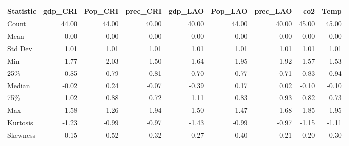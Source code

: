 \begin{table}[htbp]
\centering
{}
\label{tab:time_series_sum}
\footnotesize
\setlength{\tabcolsep}{4pt}
\renewcommand{\arraystretch}{0.9}
\begin{tabular}{lrrrrrrrr}
\toprule
\textbf{Statistic} & \textbf{gdp\_CRI} & \textbf{Pop\_CRI} & \textbf{prec\_CRI} & \textbf{gdp\_LAO} & \textbf{Pop\_LAO} & \textbf{prec\_LAO} & \textbf{co2} & \textbf{Temp} \\
\midrule
Count & 44.00 & 44.00 & 40.00 & 40.00 & 44.00 & 40.00 & 45.00 & 45.00 \\
Mean & -0.00 & -0.00 & 0.00 & -0.00 & 0.00 & 0.00 & -0.00 & 0.00 \\
Std Dev & 1.01 & 1.01 & 1.01 & 1.01 & 1.01 & 1.01 & 1.01 & 1.01 \\
Min & -1.77 & -2.03 & -1.50 & -1.64 & -1.95 & -1.92 & -1.57 & -1.53 \\
25\% & -0.85 & -0.79 & -0.81 & -0.70 & -0.77 & -0.71 & -0.83 & -0.94 \\
Median & -0.02 & 0.24 & -0.07 & -0.39 & 0.17 & 0.02 & -0.10 & -0.10 \\
75\% & 1.02 & 0.88 & 0.72 & 1.11 & 0.83 & 0.93 & 0.82 & 0.73 \\
Max & 1.58 & 1.26 & 1.94 & 1.50 & 1.47 & 1.68 & 1.85 & 1.95 \\
Kurtosis & -1.23 & -0.99 & -0.97 & -1.43 & -0.99 & -0.97 & -1.15 & -1.11 \\
Skewness & -0.15 & -0.52 & 0.32 & 0.27 & -0.40 & -0.21 & 0.20 & 0.30 \\
\bottomrule
\end{tabular}
\end{table}
